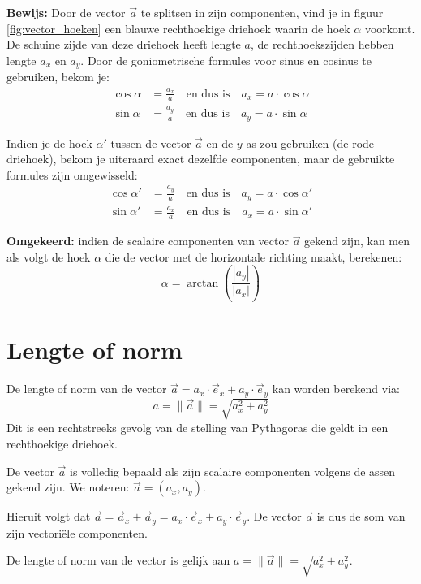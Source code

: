 \documentclass{ximera}
\begin{document}
\textbf{Bewijs:} Door de vector $\vec{a}$ te splitsen in zijn componenten, vind je in figuur \ref{fig:vector_hoeken} een blauwe rechthoekige driehoek waarin de hoek $\alpha$ voorkomt. De schuine zijde van deze driehoek heeft lengte $a$, de rechthoekszijden hebben lengte $a_x$ en $a_y$. Door de goniometrische formules voor sinus en cosinus te gebruiken, bekom je:
\begin{align*}
    \cos \alpha &= \frac{a_x}{a} \quad \text{en dus is} \quad a_x = a \cdot \cos \alpha \\
    \sin \alpha &= \frac{a_y}{a} \quad \text{en dus is} \quad a_y = a \cdot \sin \alpha
\end{align*}     

Indien je de hoek $\alpha '$ tussen de vector $\vec{a}$ en de $y$-as zou gebruiken (de rode driehoek), bekom je uiteraard exact dezelfde componenten, maar de gebruikte formules zijn omgewisseld:
\begin{align*}
    \cos \alpha' &= \frac{a_y}{a} \quad \text{en dus is} \quad a_y = a \cdot \cos \alpha' \\
    \sin \alpha' &= \frac{a_x}{a} \quad \text{en dus is} \quad a_x = a \cdot \sin \alpha'
\end{align*} 

\textbf{Omgekeerd:} indien de scalaire componenten van vector $\vec{a}$ gekend zijn, kan men als volgt de hoek $\alpha$ die de vector met de horizontale richting maakt, berekenen:
\[ \alpha = \arctan\left(\frac{|a_{y}|}{|a_{x}|}\right) \] 
    

\section{Lengte of norm}

De lengte of norm van de vector $\vec{a} = a_{x} \cdot \vec{e}_{x} + a_{y} \cdot \vec{e}_{y}$ kan worden berekend via:
\[ a = \| \vec{a} \| = \sqrt{a_{x}^{2} + a_{y}^{2}} \] 
Dit is een rechtstreeks gevolg van de stelling van Pythagoras die geldt in een rechthoekige driehoek.

\begin{proposition}[title={Besluit: Vectorcomponenten en norm}]\nl
    De vector $\vec{a}$ is volledig bepaald als zijn scalaire componenten volgens de assen gekend zijn. We noteren: $\vec{a} = (a_{x}, a_{y})$.
    
    Hieruit volgt dat $\vec{a} = \vec{a}_{x} + \vec{a}_{y} = a_{x} \cdot \vec{e}_{x} + a_{y} \cdot \vec{e}_{y}$. De vector $\vec{a}$ is dus de som van zijn vectoriële componenten.
    
    De lengte of norm van de vector is gelijk aan $a = \| \vec{a} \| = \sqrt{a_{x}^{2} + a_{y}^{2}}$.
\end{proposition}
\end{document}
